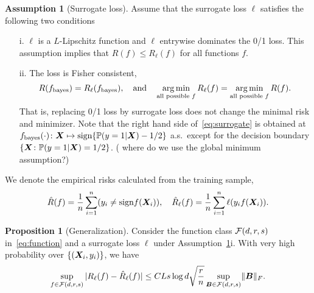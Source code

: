 \documentclass[11pt]{article}
\theoremstyle{definition}
\newtheorem{ass}{Assumption}
\newtheorem{prop}[thm]{Proposition}
\newtheorem{defn}{Definition}
\def\sign{\textup{sgn}}
\def\newX{\mX_{\textup{new}}}
\def\newy{y_{\textup{new}}}
\def\sign{\textup{sign}}
\begin{document}
\begin{ass}[Surrogate loss]\label{ass:loss}
Assume that the surrogate loss $\ell$ satisfies the following two conditions
\begin{enumerate}
\item [i.]$\ell$ is a $L$-Lipschitz function and $\ell$ entrywise dominates the 0/1 loss. This assumption implies that $R(f)\leq R_\ell(f)$ for all functions $f$.
\item [ii.]The loss is Fisher consistent,
\begin{equation}\label{eq:surrogate}
R(f_\text{bayes})=R_\ell(f_\text{bayes}),\quad \text{and} \quad \operatorname*{arg\,min}_{\text{all possible $f$}} R_\ell(f)=\operatorname*{arg\,min}_{\text{all possible $f$}} R(f).
\end{equation}
That is, replacing 0/1 loss by surrogate loss does not change the minimal risk and minimizer. Note that the right hand side of~\eqref{eq:surrogate} is obtained at $f_\text{bayes}(\cdot)\colon \mX\mapsto \sign \{\mathbb{P}(y=1|\mX)-1/2\}$ a.s.\ except for the decision boundary $\{\bm X\colon \mathbb{P}(y=1|\bm X)=1/2\}$. ({\color{red} where do we use the global minimum assumption?})
\end{enumerate}
\end{ass}


We denote the empirical risks calculated from the training sample,
\[
\hat R(f)={1\over n}\sum_{i=1}^n(y_i\neq \sign f(\mX_i)),\quad \hat R_\ell(f) = {1\over n}\sum_{i=1}^n\ell(y_i f(\mX_i)). 
\]

\begin{prop}[Generalization]\label{prop:generalize}
Consider the function class $\mathcal{F}(d,r,s)$ in~\eqref{eq:function} and a surrogate loss $\ell$ under Assumption~\ref{ass:loss}i. With very high probability over $\{(\bm X_i, y_i)\}$, we have
\[
\sup_{f\in \mathcal{F}(d,r,s)}|R_\ell(f)-\hat R_\ell(f)| \leq CL s\log d  \sqrt{r\over n}  \sup_{\bm B\in\mathcal{F}(d,r,s)}\lVert\bm B\rVert_F.
\]
\end{prop} 



\end{document}
